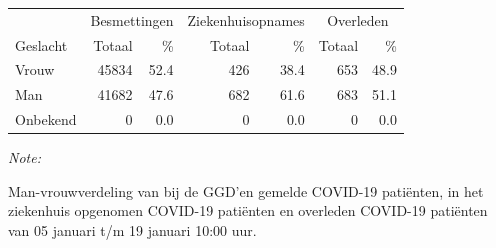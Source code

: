 \documentclass[
  english,
  man,floatsintext]{apa6}
\begin{document}
\begin{table}[H]
\centering\begingroup\fontsize{11}{13}\selectfont

\begin{threeparttable}
\begin{tabular}{lrrrrrr}
\toprule
\multicolumn{1}{c}{ } & \multicolumn{2}{c}{Besmettingen} & \multicolumn{2}{c}{Ziekenhuisopnames} & \multicolumn{2}{c}{Overleden} \\
\cmidrule(l{3pt}r{3pt}){2-3} \cmidrule(l{3pt}r{3pt}){4-5} \cmidrule(l{3pt}r{3pt}){6-7}
Geslacht & Totaal & \% & Totaal & \% & Totaal & \%\\
\midrule
Vrouw & 45834 & 52.4 & 426 & 38.4 & 653 & 48.9\\
Man & 41682 & 47.6 & 682 & 61.6 & 683 & 51.1\\
Onbekend & 0 & 0.0 & 0 & 0.0 & 0 & 0.0\\
\bottomrule
\end{tabular}
\begin{tablenotes}
\item \textit{Note: } 
\item Man-vrouwverdeling van bij de GGD’en gemelde COVID-19 patiënten, in het ziekenhuis opgenomen COVID-19 patiënten en overleden COVID-19 patiënten van 05 januari t/m 19 januari 10:00 uur.
\end{tablenotes}
\end{threeparttable}
\endgroup{}
\end{table}
\newpage
\end{document}
